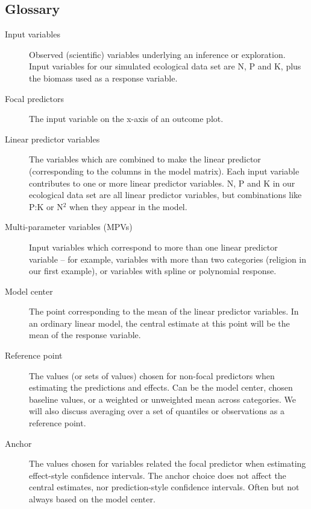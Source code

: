 \begin{gloss}
\subsection*{Glossary}
\begin{description}
\item [Input variables] Observed (scientific) variables underlying an inference or exploration. Input variables for our simulated ecological data set are N, P and K, plus the biomass used as a response variable.

\item [Focal predictors] The input variable on the x-axis of an outcome plot.

\item [Linear predictor variables] The variables which are combined to make the linear predictor (corresponding to the columns in the model matrix). Each input variable contributes to one or more linear predictor variables. N, P and K in our ecological data set are all linear predictor variables, but combinations like P:K or N$\mbox{}^2$ when they appear in the model.

\item[Multi-parameter variables (MPVs)] Input variables which correspond to more than one linear predictor variable -- for example, variables with more than two categories (religion in our first example), or variables with spline or polynomial response. 

\item [Model center] The point corresponding to the mean of the linear predictor variables. In an ordinary linear model, the central estimate at this point will be the mean of the response variable. 

\item [Reference point] The values (or sets of values) chosen for non-focal predictors when estimating the predictions and effects. Can be the model center, chosen baseline values, or a weighted or unweighted mean across categories. We will also discuss averaging over a set of quantiles or observations as a reference point.

\item [Anchor] The values chosen for variables related the focal predictor when estimating effect-style confidence intervals. The anchor choice does not affect the central estimates, nor prediction-style confidence intervals. Often but not always based on the model center. 

\end{description}
\end{gloss}

